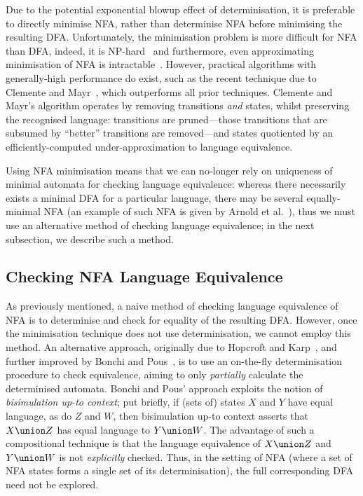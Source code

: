 Due to the potential exponential blowup effect of determinisation, it is
preferable to directly minimise NFA, rather than determinise NFA before
minimising the resulting DFA. Unfortunately, the minimisation problem is more
difficult for NFA than DFA, indeed, it is NP-hard~\cite{Bjorklund2011} and
furthermore, even approximating minimisation of NFA is
intractable~\cite{Gramlich2007}.  However, practical algorithms with
generally-high performance do exist, such as the recent technique due to
{Clemente and Mayr}~\cite{Mayr2013}, which outperforms all prior techniques.
Clemente and Mayr's algorithm operates by removing transitions \emph{and}
states, whilst preserving the recognised language: transitions are
pruned---those transitions that are subsumed by ``better'' transitions are
removed---and states quotiented by an efficiently-computed under-approximation
to language equivalence.

Using NFA minimisation means that we can no-longer rely on uniqueness of
minimal automata for checking language equivalence: whereas there necessarily
exists a minimal DFA for a particular language, there may be several
equally-minimal NFA (an example of such NFA is given by {Arnold et
al.}~\cite{Arnold1992}), thus we must use an alternative method of checking
language equivalence; in the next subsection, we describe such a method.

\subsection{Checking NFA Language Equivalence} \label{sec:checkNfaLangEquiv}

As previously mentioned, a naive method of checking language equivalence of NFA
is to determinise and check for equality of the resulting DFA. However, once
the minimisation technique does not use determinisation, we cannot employ this
method. An alternative approach, originally due to {Hopcroft and
Karp}~\cite{Hopcroft1971}, and further improved by {Bonchi and
Pous}~\cite{Bonchi2013}, is to use an on-the-fly determinisation procedure to
check equivalence, aiming to only \emph{partially} calculate the determinised
automata. {Bonchi and Pous}' approach exploits the notion of \emph{bisimulation
up-to context}; put briefly, if (sets of) states $X$ and $Y$ have equal
language, as do $Z$ and $W$, then bisimulation up-to context asserts that $X
\union Z$ has equal language to $Y \union W$. The advantage of such a
compositional technique is that the language equivalence of $X \union Z$ and $Y
\union W$ is not \emph{explicitly} checked. Thus, in the setting of NFA (where
a set of NFA states forms a single set of its determinisation), the full
corresponding DFA need not be explored.

